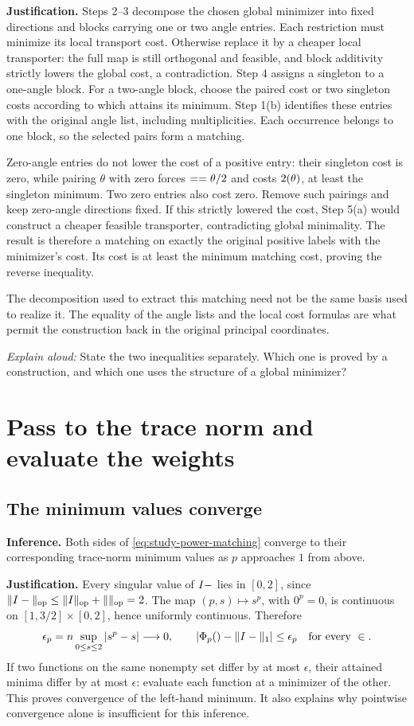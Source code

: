 \documentclass[11pt]{article}
\numberwithin{equation}{section}
\newcommand{\W}{\sym{Wcompetitor}}
\newcommand{\Fset}{\sym{FeasibleTransport}}
\newcommand{\Phicost}{\like{PowerCost}{\Phi_p}}
\newcommand{\fphase}{\sym{MatchingPhaseCost}}
\newcommand{\hmean}{\sym{PairMeanAngle}}
\newcommand{\dhalf}{\sym{PairHalfDifference}}
\newcommand{\why}{\par\smallskip\noindent\textbf{Justification.} }
\newcommand{\rehearse}[1]{\par\smallskip\noindent\textit{Explain aloud:} #1\par}
\begin{document}
\why Steps 2--3 decompose the chosen global minimizer into fixed
directions and blocks carrying one or two angle entries. Each restriction
must minimize its local transport cost. Otherwise replace it by a cheaper
local transporter: the full map is still orthogonal and feasible, and
block additivity strictly lowers the global cost, a contradiction.
Step 4 assigns a singleton to a one-angle block. For a two-angle block,
choose the paired cost or two singleton costs according to which attains
its minimum. Step 1(b) identifies these entries with the original angle
list, including multiplicities. Each occurrence belongs to one block,
so the selected pairs form a matching.

Zero-angle entries do not lower the cost of a positive entry: their
singleton cost is zero, while pairing $\theta$ with zero forces
$\dhalf=\hmean=\theta/2$ and costs $2\fphase(\theta)$, at least the
singleton minimum. Two zero entries also cost zero. Remove such pairings
and keep zero-angle directions fixed. If this strictly lowered the cost,
Step 5(a) would construct a cheaper feasible transporter, contradicting
global minimality. The result is therefore a matching on exactly
the original positive labels with the minimizer's cost. Its cost is at
least the minimum matching cost, proving the reverse inequality.

The decomposition used to extract this matching need not be the same
basis used to realize it. The equality of the angle lists and the local
cost formulas are what permit the construction back in the original
principal coordinates.
\rehearse{State the two inequalities separately. Which one is proved by
a construction, and which one uses the structure of a global minimizer?}

\section{Pass to the trace norm and evaluate the weights}

\subsection{The minimum values converge}
\textbf{Inference.} Both sides of \cref{eq:study-power-matching} converge
to their corresponding trace-norm minimum values as $p$ approaches $1$
from above.

\why Every singular value of $I-\W$ lies in $[0,2]$, since
$\|I-\W\|_{\mathrm{op}}\le\|I\|_{\mathrm{op}}+\|\W\|_{\mathrm{op}}=2$.
The map $(p,s)\mapsto s^p$, with $0^p=0$, is continuous on
$[1,3/2]\times[0,2]$, hence uniformly continuous. Therefore
\[
 \epsilon_p=n\sup_{0\le s\le2}|s^p-s|\longrightarrow0,
 \qquad
 |\Phicost(\W)-\|I-\W\|_1|\le\epsilon_p
 \quad\text{for every }\W\in\Fset.
\]
If two functions on the same nonempty set differ by at most $\epsilon$,
their attained minima differ by at most $\epsilon$: evaluate each
function at a minimizer of the other. This proves convergence of the
left-hand minimum. It also explains why pointwise convergence alone is
insufficient for this inference.
\end{document}
